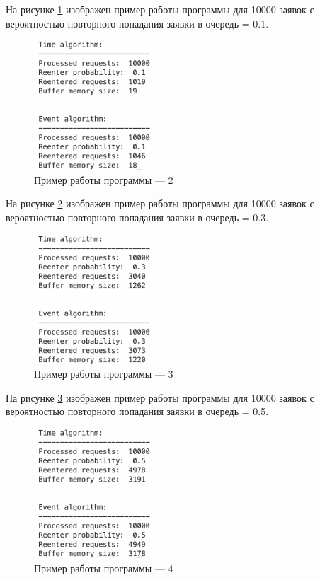 \documentclass[12pt]{report}
\begin{document}
На рисунке \ref{fig:pic2} изображен пример работы программы для 10000 заявок с вероятностью повторного попадания заявки в очередь = 0.1.

\begin{figure}[h!btp]
	\centering
	\includegraphics[width=0.4\textwidth]{inc/pic2.png}
	\caption{Пример работы программы --- 2}
	\label{fig:pic2}	
\end{figure}
\clearpage

На рисунке \ref{fig:pic3} изображен пример работы программы для 10000 заявок с вероятностью повторного попадания заявки в очередь = 0.3.

\begin{figure}[h!btp]
	\centering
	\includegraphics[width=0.4\textwidth]{inc/pic3.png}
	\caption{Пример работы программы --- 3}
	\label{fig:pic3}	
\end{figure}

На рисунке \ref{fig:pic4} изображен пример работы программы для 10000 заявок с вероятностью повторного попадания заявки в очередь = 0.5.

\begin{figure}[h!btp]
	\centering
	\includegraphics[width=0.4\textwidth]{inc/pic4.png}
	\caption{Пример работы программы --- 4}
	\label{fig:pic4}	
\end{figure}
\clearpage
\end{document}
